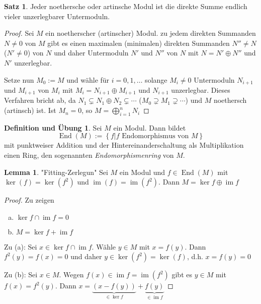 \documentclass[
twoside=semi,
fontsize=12,
DIV=12, 
cleardoublepage=current,
leqno,
headings=optiontoheadandtoc, 
toc=idx
]{scrbook}
\newcommand{\set}[1]{\left\{ #1 \right\}}
\DeclareMathOperator{\im}{im}
\DeclareMathOperator{\End}{End}
\theoremstyle{definition}
\newtheorem{satz}[definition]{Satz}
\newtheorem{lemma}[definition]{Lemma}
\newtheorem{defueb}[definition]{Definition und \"Ubung}
\begin{document}
	\begin{satz}\label{1.5.5}
		Jeder noethersche oder artinsche Modul ist die direkte Summe endlich vieler unzerlegbarer Untermoduln.
		
		\begin{proof}
			Sei $M$ ein noetherscher (artinscher) Modul. zu jedem direkten Summanden $N \neq 0$ von $M$ gibt es einen maximalen (minimalen) direkten Summanden $N'' \neq N$ ($N' \neq 0$) von $N$ und daher Untermoduln $N'$ und $N''$ von $N$ mit $N = N' \oplus N''$ und $N'$ unzerlegbar.
			
			Setze nun $M_0 := M$ und w\"ahle f\"ur $i=0,1,\dots$ solange $M_i\neq 0$ Untermoduln $N_{i+1}$ und $M_{i+1}$ von $M_i$ mit $M_i = N_{i+1} \oplus M_{i+1}$ und $N_{i+1}$ unzerlegbar. Dieses Verfahren bricht ab, da $N_1 \subsetneq N_1 \oplus N_2 \subsetneq \cdots$ ($M_0 \supsetneq M_1 \supsetneq \cdots$) und $M$ noethersch (artinsch) ist. Ist $M_n = 0$, so $\displaystyle M = \bigoplus_{i=1}^n N_i$
		\end{proof}
	\end{satz}

	\begin{defueb}\label{1.5.6}
		Sei $M$ ein Modul. Dann bildet 
			\[\End(M):= \set{f|f \textrm{ Endomorphismus von } M}\] 
			mit punktweiser Addition und der Hintereinanderschaltung als Multiplikation einen Ring, den sogenannten \emph{Endomorphismenring} von $M$.
	\end{defueb}

	\begin{lemma}\label{1.5.7}
		"Fitting-Zerlegun"\newline
		Sei $M$ ein Modul und $f \in \End(M)$ mit $\ker(f) = \ker(f^2)$ und $\im(f) = \im(f^2)$. Dann $M = \ker f \oplus \im f$
		
		\begin{proof}
			Zu zeigen
			\begin{enumerate}[(a)]
				\item $\ker f \cap \im f = 0$
				\item $M = \ker f + \im f$
			\end{enumerate}
			Zu (a): Sei $x \in \ker f \cap \im f$. W\"ahle $y \in M$ mit $x = f(y)$. Dann $f^2(y) = f(x) = 0$ und daher $y \in \ker(f^2) = \ker(f)$, d.h. $x = f(y) = 0$
			
			Zu (b): Sei $x \in M$. Wegen $f(x) \in \im f = \im(f^2)$ gibt es $y \in M$ mit $f(x) = f^2(y)$. Dann $x = \underbrace{(x - f(y))}_{\in \ker f} + \underbrace{f(y)}_{\in \im f}$
		\end{proof}
	\end{lemma}
\end{document}
